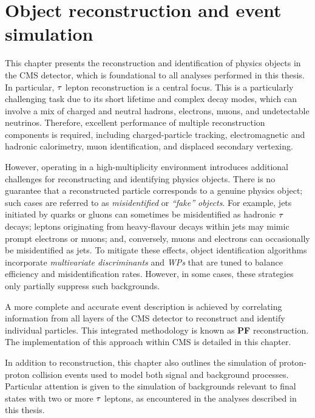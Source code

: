 \chapter{Object reconstruction and event simulation}
\thispagestyle{plain}  %
\pagestyle{chapterpages}
\label{Section:Chapter4}
\minitoc

This chapter presents the reconstruction and identification of physics objects in the \ac{CMS} detector, which is foundational to all analyses performed in this thesis. In particular, $\tau$ lepton reconstruction is a central focus. This is a particularly challenging task due to its short lifetime and complex decay modes, which can involve a mix of charged and neutral hadrons, electrons, muons, and undetectable neutrinos. Therefore, excellent performance of multiple reconstruction components is required, including charged-particle tracking, electromagnetic and hadronic calorimetry, muon identification, and displaced secondary vertexing.

However, operating in a high-multiplicity environment introduces additional challenges for reconstructing and identifying physics objects. There is no guarantee that a reconstructed particle corresponds to a genuine physics object; such cases are referred to as \textit{misidentified} or \textit{``fake'' objects}. For example, jets initiated by quarks or gluons can sometimes be misidentified as hadronic $\tau$ decays; leptons originating from heavy-flavour decays within jets may mimic prompt electrons or muons; and, conversely, muons and electrons can occasionally be misidentified as jets. To mitigate these effects, object identification algorithms incorporate \textit{multivariate discriminants} and \textit{\acp{WP}} that are tuned to balance efficiency and misidentification rates. However, in some cases, these strategies only partially suppress such backgrounds.

A more complete and accurate event description is achieved by correlating information from all layers of the \ac{CMS} detector to reconstruct and identify individual particles. This integrated methodology is known as \textbf{\ac{PF}} reconstruction. The implementation of this approach within \ac{CMS} is detailed in this chapter.

In addition to reconstruction, this chapter also outlines the simulation of proton-proton collision events used to model both signal and background processes. Particular attention is given to the simulation of backgrounds relevant to final states with two or more $\tau$ leptons, as encountered in the analyses described in this thesis.


